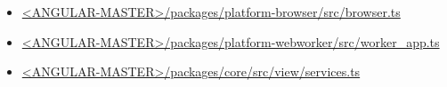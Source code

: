 



\begin{itemize}
  \item \href{https://github.com/angular/angular/blob/master/packages/platform-browser/src/browser.ts}
        {<ANGULAR-MASTER>/packages/platform-browser/src/browser.ts}
\end{itemize}





\begin{itemize}
  \item \href{https://github.com/angular/angular/blob/master/packages/platform-webworker/src/worker_app.ts}
        {<ANGULAR-MASTER>/packages/platform-webworker/src/worker\_app.ts}
\end{itemize}





\begin{itemize}
  \item \href{https://github.com/angular/angular/blob/master/packages/core/src/view/services.ts}
        {<ANGULAR-MASTER>/packages/core/src/view/services.ts}
\end{itemize}







